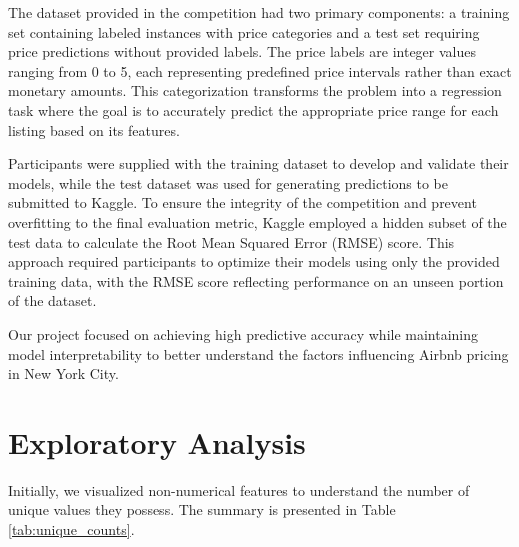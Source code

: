 \documentclass[12pt]{article}
\begin{document}
The dataset provided in the competition had two primary components: a training set containing labeled instances with price categories and a test set requiring price predictions without provided labels. The price labels are integer values ranging from 0 to 5, each representing predefined price intervals rather than exact monetary amounts. This categorization transforms the problem into a regression task where the goal is to accurately predict the appropriate price range for each listing based on its features.

Participants were supplied with the training dataset to develop and validate their models, while the test dataset was used for generating predictions to be submitted to Kaggle. To ensure the integrity of the competition and prevent overfitting to the final evaluation metric, Kaggle employed a hidden subset of the test data to calculate the Root Mean Squared Error (RMSE) score. This approach required participants to optimize their models using only the provided training data, with the RMSE score reflecting performance on an unseen portion of the dataset.

Our project focused on achieving high predictive accuracy while maintaining model interpretability to better understand the factors influencing Airbnb pricing in New York City.


\section{Exploratory Analysis}

Initially, we visualized non-numerical features to understand the number of unique values they possess. The summary is presented in Table \ref{tab:unique_counts}.
\end{document}
